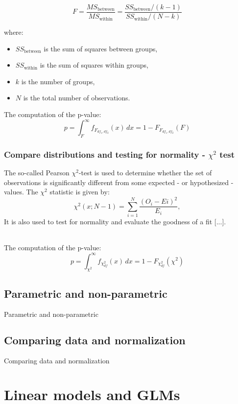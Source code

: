 \documentclass{book}
\begin{document}
\[
F = \frac{MS_{\text{between}}}{MS_{\text{within}}} = \frac{SS_{\text{between}} / (k - 1)}{SS_{\text{within}} / (N - k)}
\]

where:
\begin{itemize}
  \item $SS_{\text{between}}$ is the sum of squares between groups,
  \item $SS_{\text{within}}$ is the sum of squares within groups,
  \item $k$ is the number of groups,
  \item $N$ is the total number of observations.
\end{itemize}

The computation of the p-value:
\[
p = \int_{F}^{\infty} f_{F_{df_1, df_2}}(x)\,dx = 1 - F_{F_{df_1, df_2}}(F)
\]


\newpage

\subsection{Compare distributions and testing for normality - $\chi^{2}$ test}

The so-called Pearson $\chi^{2}$-test is used to determine whether the set of observations is significantly different from some expected - or hypothesized - values. The $\chi^{2}$ statistic is given by:
\[
    \chi^{2}(x; N - 1) = \sum_{i = 1}^{N}\frac{(O_{i} - E{i})^{2}}{E_i},
\]
It is also used to test for normality and evaluate the goodness of a fit [...].\\\

The computation of the p-value:
\[
p = \int_{\chi^2}^{\infty} f_{\chi^2_{df}}(x)\,dx = 1 - F_{\chi^2_{df}}(\chi^2)
\]

\newpage

\section{Parametric and non-parametric}

Parametric and non-parametric

\newpage

\section{Comparing data and normalization}
Comparing data and normalization



\chapter{Linear models and GLMs}
\end{document}
